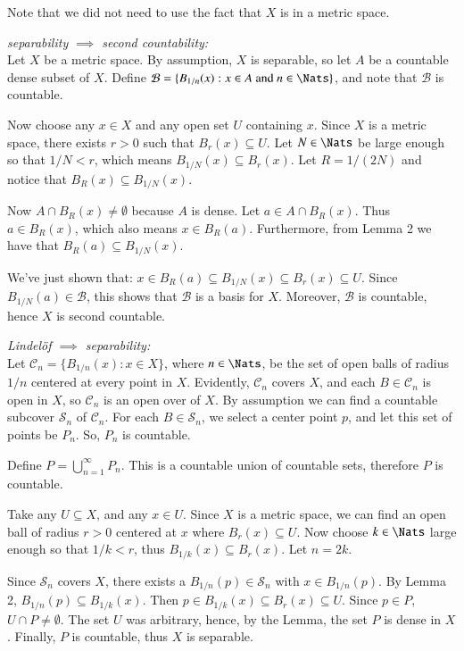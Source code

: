 \documentclass{homework}
\begin{document}
Note that we did not need to use the fact that $X$ is in a metric space.

\textit{separability $\implies$ second countability:}\\
Let $X$ be a metric space.
By assumption, $X$ is separable, so let $A$ be a countable dense subset of $X$.
Define $\mathcal{B}=\{B_{1/n}(x):x\in A \text{ and } n\in\Nats\}$, and note
that $\mathcal{B}$ is countable.

Now choose any $x\in X$ and any open set $U$ containing $x$.
Since $X$ is a metric space, there exists $r>0$ such that
$B_r(x)\subseteq U$.  Let $N\in\Nats$ be large enough so that
$1/N<r$, which means $B_{1/N}(x)\subseteq B_r(x)$.
Let $R=1/(2N)$ and notice that $B_R(x)\subseteq B_{1/N}(x)$.

Now $A\cap B_R(x)\ne\emptyset$ because $A$ is dense.
Let $a\in A\cap B_R(x)$.  Thus $a\in B_R(x)$, which
also means $x\in B_R(a)$.
Furthermore, from Lemma 2 we have that
$B_R(a)\subseteq B_{1/N}(x)$.

We've just shown that: $x\in B_R(a)\subseteq B_{1/N}(x) \subseteq B_r(x) \subseteq U$.
Since
$B_{1/N}(a)\in\mathcal{B}$, this shows that
$\mathcal{B}$ is a basis for $X$.  Moreover, $\mathcal{B}$ is
countable, hence $X$ is second countable.

\textit{Lindel\"of $\implies$ separability:}\\
Let $\mathcal{C}_n = \{B_{1/n}(x) : x\in X\}$, where $n\in\Nats$,
be the set of open balls
of radius $1/n$ centered at every point in $X$.
Evidently, $\mathcal{C}_n$ covers $X$, and
each $B\in\mathcal{C}_n$ is open in $X$,
so $\mathcal{C}_n$ is an open over of $X$.
By assumption we can find a countable subcover $\mathcal{S}_n$
of $\mathcal{C}_n$.  For each $B\in\mathcal{S}_n$, we select
a center point $p$, and let this set of points be $P_n$.
So, $P_n$ is countable.

Define $P=\displaystyle\bigcup_{n=1}^{\infty} P_n$.  This is
a countable union of countable sets, therefore $P$ is countable.

Take any $U\subseteq X$, and any $x\in U$.
Since $X$ is a metric space, we can find an open ball
of radius $r>0$ centered at $x$ where $B_r(x)\subseteq U$.  Now choose
$k\in\Nats$ large enough so that $1/k<r$, thus $B_{1/k}(x)\subseteq B_r(x)$.
Let $n=2k$.

Since $\mathcal{S}_n$
covers $X$, there exists a $B_{1/n}(p)\in\mathcal{S}_n$ with
$x\in B_{1/n}(p)$.  By Lemma 2, $B_{1/n}(p)\subseteq B_{1/k}(x)$.
Then $p\in B_{1/k}(x)\subseteq B_r(x)\subseteq U$.
Since $p\in P$, $U\cap P\ne\emptyset$.  The set $U$ was arbitrary,
hence, by the Lemma, the set $P$ is dense in $X$.
Finally, $P$ is countable, thus $X$ is separable.
\end{document}
